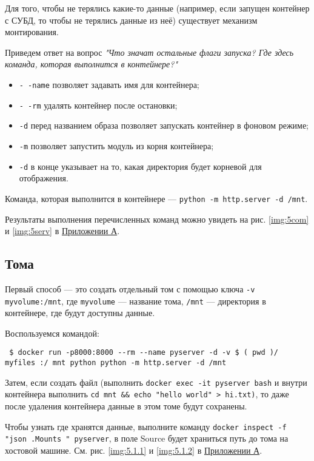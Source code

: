 \documentclass[a4paper,14pt]{extarticle}
\begin{document}
Для того, чтобы не терялись какие-то данные (например, если запущен контейнер с СУБД, то чтобы
не терялись данные из неё) существует механизм монтирования.

Приведем ответ на вопрос \textit{"Что значат остальные флаги запуска? Где здесь команда, которая выполнится в контейнере?"}
\begin{itemize}
	\item \texttt{-\,-name} позволяет задавать имя для контейнера;
	\item \texttt{-\,-rm} удалять контейнер после остановки;
	\item \texttt{-d} перед названием образа позволяет запускать контейнер в фоновом режиме;
	\item \texttt{-m} позволяет запустить модуль из корня контейнера;
	\item \texttt{-d} в конце указывает на то, какая директория будет корневой для отображения.
\end{itemize}

Команда, которая выполнится в контейнере --- \texttt{python -m http.server -d /mnt}.

Результаты выполнения перечисленных команд можно увидеть на рис. \ref{img:5com} и \ref{img:5serv} в \hyperref[A]{Приложении А}.

\subsection{Тома}

Первый способ — это создать отдельный том с помощью ключа \texttt{-v myvolume:/mnt}, где \texttt{myvolume} —
название тома, \texttt{/mnt} — директория в контейнере, где будут доступны данные.

Воспользуемся командой:
\begin{lstlisting}
 $ docker run -p8000:8000 --rm --name pyserver -d -v $ ( pwd )/ myfiles :/ mnt python python -m http.server -d /mnt
\end{lstlisting}

Затем, если создать файл (выполнить \texttt{docker exec -it pyserver bash} и внутри контейнера выполнить \texttt{cd mnt \&\& echo "hello world" > hi.txt)}, то даже после удаления контейнера данные в этом томе будут сохранены.

Чтобы узнать где хранятся данные, выполните команду
\texttt{docker inspect -f "{{json .Mounts }}" pyserver}, в поле Source будет храниться путь до тома на
хостовой машине. См. рис. \ref{img:5.1.1} и \ref{img:5.1.2} в \hyperref[A]{Приложении А}.
\end{document}
